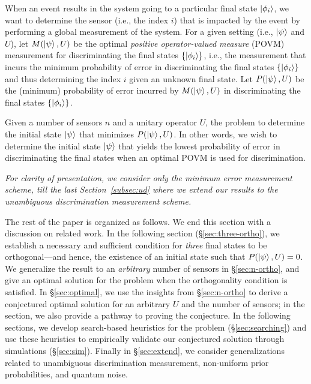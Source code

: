 When an event results in the system going to a particular final state $\ket{\phi_i}$, 
we want to determine the sensor (i.e., the index $i$) that is impacted by the event by performing a global measurement of the system. For a given setting (i.e.,  $\ket{\psi}$ and $U$), let 
$M(\ket{\psi}, U)$ be the optimal 
{\em positive operator-valued measure} (POVM) measurement for discriminating the
final states $\{\ket{\phi_i}\}$, i.e., 
the measurement that incurs the
minimum probability of error in 
discriminating the
final states $\{\ket{\phi_i}\}$ and thus
determining the index 
$i$ given an unknown final state.
Let $P(\ket{\psi}, U)$ be the (minimum) probability of error incurred by $M(\ket{\psi}, U)$ in discriminating the final states $\{\ket{\phi_i}\}$.

Given a number of sensors $n$ and a 
unitary operator $U$, 
the \iso problem to determine the 
initial state $\ket{\psi}$ that minimizes
$P(\ket{\psi}, U)$.
In other words, we wish to determine the initial state $\ket{\psi}$ 
that yields the lowest probability of error in discriminating the final states when
an optimal POVM is used for discrimination.

{\em For clarity of presentation, we consider only the minimum error measurement 
scheme, till the last Section~\ref{subsec:ud} where we extend our results to the unambiguous discrimination measurement scheme.}

The rest of the paper is organized as follows. We end this section with a discussion on related work.
In the following section (\S\ref{sec:three-ortho}), 
we establish a necessary and sufficient condition for \emph{three} final states to be orthogonal---and hence, the existence of an initial state such that 
$P(\ket{\psi}, U) = 0$. 
We generalize the result to an \emph{arbitrary} number of sensors in \S\ref{sec:n-ortho},
and give an optimal solution for the \iso problem when the orthogonality condition is satisfied.
In \S\ref{sec:optimal}, we use the insights from \S\ref{sec:n-ortho} to derive a conjectured optimal solution for an arbitrary $U$ and the number of sensors; in the section, we also provide a pathway to proving the conjecture. 
In the following sections, we develop search-based heuristics for the problem (\S\ref{sec:searching}) and use these heuristics to 
empirically validate our conjectured solution through simulations (\S\ref{sec:sim}).
Finally in \S\ref{sec:extend}, we consider generalizations related to 
unambiguous discrimination measurement, non-uniform prior probabilities, and quantum noise.

